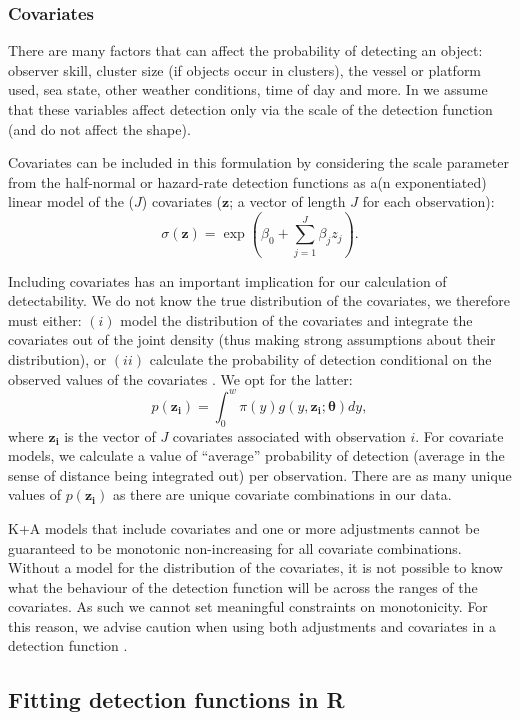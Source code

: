 \documentclass[article]{jss}\usepackage[]{graphicx}\usepackage[]{color}
\begin{document}
\subsubsection{Covariates}

There are many factors that can affect the probability of detecting an object: observer skill, cluster size (if objects occur in clusters), the vessel or platform used, sea state, other weather conditions, time of day and more. In  we assume that these variables affect detection only via the scale of the detection function (and do not affect the shape).

Covariates can be included in this formulation by considering the scale parameter from the half-normal or hazard-rate detection functions as a(n exponentiated) linear model of the ($J$) covariates ($\mathbf{z}$; a vector of length $J$ for each observation):
$$
\sigma(\mathbf{z}) = \exp(\beta_0 + \sum_{j=1}^J \beta_j z_j).
$$

Including covariates has an important implication for our calculation of detectability. We do not know the true distribution of the covariates, we therefore must either: $(i)$ model the distribution of the covariates and integrate the covariates out of the joint density (thus making strong assumptions about their distribution), or $(ii)$ calculate the probability of detection conditional on the observed values of the covariates \citep{Marques:2003vb}. We opt for the latter:
$$
p(\mathbf{z_i}) = \int_0^w \pi(y) g(y, \mathbf{z_i}; \boldsymbol{\theta}) dy,
$$
where $\mathbf{z_i}$ is the vector of $J$ covariates associated with observation $i$. For covariate models, we calculate a value of ``average'' probability of detection (average in the sense of distance being integrated out) per observation. There are as many unique values of $p(\mathbf{z_i})$ as there are unique covariate combinations in our data.

K+A models that include covariates and one or more adjustments cannot be guaranteed to be monotonic non-increasing for all covariate combinations. Without a model for the distribution of the covariates, it is not possible to know what the behaviour of the detection function will be across the ranges of the covariates. As such we cannot set meaningful constraints on monotonicity. For this reason, we advise caution when using both adjustments and covariates in a detection function \citep[see][for an example of when this can be problematic]{Miller:2015hw}.


\subsection{Fitting detection functions in R}
\end{document}
